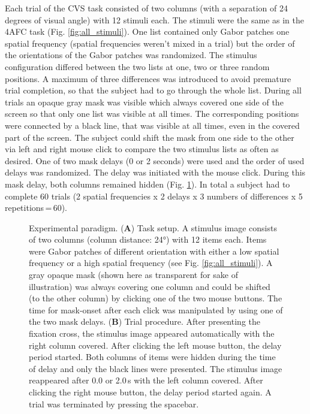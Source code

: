 Each trial of the CVS task consisted of two columns (with a separation of 24 degrees of visual angle) with 12 stimuli each. The stimuli were the same as in the 4AFC task (Fig. \ref{fig:all_stimuli}). One list contained only Gabor patches one spatial frequency (spatial frequencies weren't mixed in a trial) but the order of the orientations of the Gabor patches was randomized. The stimulus configuration differed between the two lists at one, two or three random positions. A maximum of three differences was introduced to avoid premature trial completion, so that the subject had to go through the whole list. 
During all trials an opaque gray mask was visible which always covered one side of the screen so that only one list was
visible at all times. The corresponding positions were connected by a black line, that was visible at all times, even in the covered part of the screen. 
The subject could shift the mask from one side to the other via left and right mouse click to compare the two stimulus lists as often as desired.
One of two mask delays (0 or 2 seconds) were used and the order of used delays was randomized. The delay was initiated with the mouse click. During this mask delay, both columns remained hidden (Fig. \ref{fig:cvs_stimulus}). 
In total a subject had to complete 60 trials (2 spatial frequencies x 2 delays x 3 numbers of differences x 5\,repetitions\,=\,60). 
\begin{figure}[H]
    \centering
    
    \caption[CVS stimulus]{Experimental paradigm. (\textbf{A}) Task setup. A stimulus image consists of two columns (column distance: 24°) with 12 items each. Items were Gabor patches of different orientation with either a low spatial frequency or a high spatial frequency (see Fig. \ref{fig:all_stimuli}). A gray opaque mask (shown here as transparent for sake of illustration) was always covering one column and could be shifted (to the other column) by clicking one of the two mouse buttons. The time for mask-onset after each click was manipulated by using one of the two mask delays. (\textbf{B}) Trial procedure. After presenting the fixation cross, the stimulus image appeared automatically with the right column covered. After clicking the left mouse button, the delay period started. Both columns of items were hidden during the time of delay and only the black lines were presented. The stimulus image reappeared after 0.0 or 2.0\,s with the left column covered. After clicking the right mouse button, the delay period started again. A trial was terminated by pressing the spacebar.}
    \label{fig:cvs_stimulus}
\end{figure}
